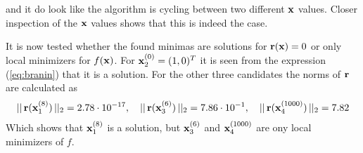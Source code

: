 and it do look like the algorithm is cycling between two different $\mathbf{x}$ values. Closer inspection of the $\mathbf{x}$ values shows that this is indeed the case. \par
It is now tested whether the found minimas are solutions for $\mathbf{r}(\mathbf{x})=0$ or only local minimizers for $f(\mathbf{x})$. For $\mathbf{x}_2^{(0)}=(1,0)^T$ it is seen from the expression (\ref{eq:branin}) that it is a solution. For the other three candidates the norms of $\mathbf{r}$ are calculated as
\begin{gather*}
    ||\,\mathbf{r}(\mathbf{x}_1^{(8)})\,||_2 = 2.78\cdot 10^{-17}, \quad 
    ||\,\mathbf{r}(\mathbf{x}_3^{(6)})\,||_2 = 7.86\cdot 10^{-1}, \quad||\,\mathbf{r}(\mathbf{x}_4^{(1000)})\,||_2 = 7.82
\end{gather*}
Which shows that $\mathbf{x}_1^{(8)}$ is a solution, but $\mathbf{x}_3^{(6)}$ and $\mathbf{x}_4^{(1000)}$ are ony local minimizers of $f$.
